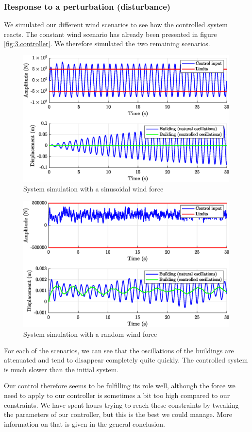 \subsubsection{Response to a perturbation (disturbance)}
We simulated our different wind scenarios to see how the controlled system reacts. The constant wind scenario has already been presented in figure \ref{fig:3.controller}. We therefore simulated the two remaining scenarios.
\begin{figure}[H]
    \centering
    \includegraphics[width=\textwidth]{resources/eps/3_sinusoidal.eps}
    \caption{System simulation with a sinusoidal wind force}
\end{figure}
\begin{figure}[H]
    \centering
    \includegraphics[width=\textwidth]{resources/eps/3_random.eps}
    \caption{System simulation with a random wind force}
\end{figure}
For each of the scenarios, we can see that the oscillations of the buildings are attenuated and tend to disappear completely quite quickly. The controlled system is much slower than the initial system.\par
Our control therefore seems to be fulfilling its role well, although the force we need to apply to our controller is sometimes a bit too high compared to our constraints. We have spent hours trying to reach these constraints by tweaking the parameters of our controller, but this is the best we could manage. More information on that is given in the general conclusion.

